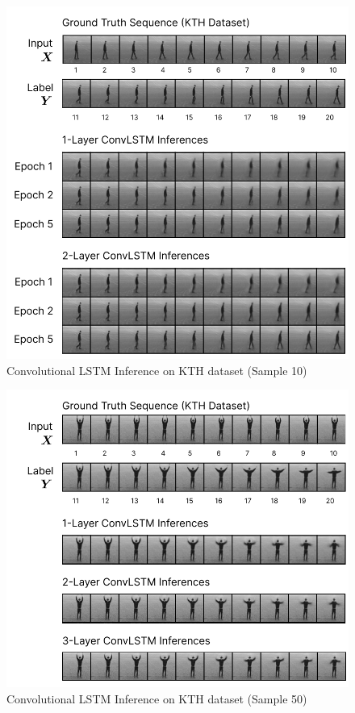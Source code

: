 \documentclass{scrartcl}
\begin{document}
\begin{figure}[H]
	\begin{center}
		\includegraphics[width=1\textwidth]{inferences/kth/kth_inferences.png}
	\end{center}
	\caption{Convolutional LSTM Inference on KTH dataset (Sample 10)}
	\label{inf:lstm_kth_inference}
\end{figure}

\begin{figure}[H]
	\begin{center}
		\includegraphics[width=1\textwidth]{inferences/kth/kth_inferences_2.png}
	\end{center}
	\caption{Convolutional LSTM Inference on KTH dataset (Sample 50)}
	\label{inf:lstm_kth_inference}
\end{figure}
\end{document}
